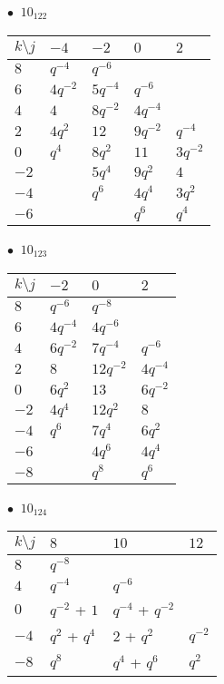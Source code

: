 \begin{minipage}{\linewidth}
$\bullet\ $ $10_{122}$ \vspace{0.5em} \\
\begin{tabular}{l|llll}
$k \setminus j$ & $-4$ & $-2$ & $0$ & $2$ \\
\hline
$8$ & $q^{-4}$ & $q^{-6}$ &  &  \\
$6$ & $4q^{-2}$ & $5q^{-4}$ & $q^{-6}$ &  \\
$4$ & $4$ & $8q^{-2}$ & $4q^{-4}$ &  \\
$2$ & $4q^{2}$ & $12$ & $9q^{-2}$ & $q^{-4}$ \\
$0$ & $q^{4}$ & $8q^{2}$ & $11$ & $3q^{-2}$ \\
$-2$ &  & $5q^{4}$ & $9q^{2}$ & $4$ \\
$-4$ &  & $q^{6}$ & $4q^{4}$ & $3q^{2}$ \\
$-6$ &  &  & $q^{6}$ & $q^{4}$ \\
\end{tabular}
\vspace{2em}
\end{minipage}
%
\begin{minipage}{\linewidth}
$\bullet\ $ $10_{123}$ \vspace{0.5em} \\
\begin{tabular}{l|lll}
$k \setminus j$ & $-2$ & $0$ & $2$ \\
\hline
$8$ & $q^{-6}$ & $q^{-8}$ &  \\
$6$ & $4q^{-4}$ & $4q^{-6}$ &  \\
$4$ & $6q^{-2}$ & $7q^{-4}$ & $q^{-6}$ \\
$2$ & $8$ & $12q^{-2}$ & $4q^{-4}$ \\
$0$ & $6q^{2}$ & $13$ & $6q^{-2}$ \\
$-2$ & $4q^{4}$ & $12q^{2}$ & $8$ \\
$-4$ & $q^{6}$ & $7q^{4}$ & $6q^{2}$ \\
$-6$ &  & $4q^{6}$ & $4q^{4}$ \\
$-8$ &  & $q^{8}$ & $q^{6}$ \\
\end{tabular}
\vspace{2em}
\end{minipage}
%
\begin{minipage}{\linewidth}
$\bullet\ $ $10_{124}$ \vspace{0.5em} \\
\begin{tabular}{l|lll}
$k \setminus j$ & $8$ & $10$ & $12$ \\
\hline
$8$ & $q^{-8}$ &  &  \\
$4$ & $q^{-4}$ & $q^{-6}$ &  \\
$0$ & $q^{-2}$ + $1$ & $q^{-4}$ + $q^{-2}$ &  \\
$-4$ & $q^{2}$ + $q^{4}$ & $2$ + $q^{2}$ & $q^{-2}$ \\
$-8$ & $q^{8}$ & $q^{4}$ + $q^{6}$ & $q^{2}$ \\
\end{tabular}
\vspace{2em}
\end{minipage}

